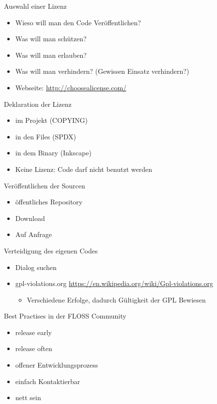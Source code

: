 \begin{frame}{Auswahl einer Lizenz}
	\begin{itemize}
		\item Wieso will man den Code Veröffentlichen? 
		\item Was will man schützen?
		\item Was will man erlauben?
		\item Was will man verhindern? (Gewissen Einsatz verhindern?)
		\item Webseite: \url{http://choosealicense.com/}
	\end{itemize}
\end{frame}

\begin{frame}{Deklaration der Lizenz}
	\begin{itemize}
		\item im Projekt (COPYING)
		\item in den Files (SPDX)
		\item in dem Binary (Inkscape)
		\item Keine Lizenz: Code darf nicht benutzt werden
	\end{itemize}
\end{frame}

\begin{frame}{Veröffentlichen der Sourcen}
	\begin{itemize}
		\item öffentliches Repository
		\item Download
		\item Auf Anfrage
	\end{itemize}
\end{frame}

\begin{frame}{Verteidigung des eigenen Codes}
	\begin{itemize}
		\item Dialog suchen
		\item gpl-violations.org \url{https://en.wikipedia.org/wiki/Gpl-violations.org}
		\begin{itemize}
			\item Verschiedene Erfolge, dadurch Gültigkeit der GPL Bewiesen
		\end{itemize}
	\end{itemize}
\end{frame}

\begin{frame}{Best Practises in der FLOSS Community}
	\begin{itemize}
		\item release early
		\item release often
		\item offener Entwicklungsprozess
		\item einfach Kontaktierbar
		\item nett sein
	\end{itemize}
\end{frame}
